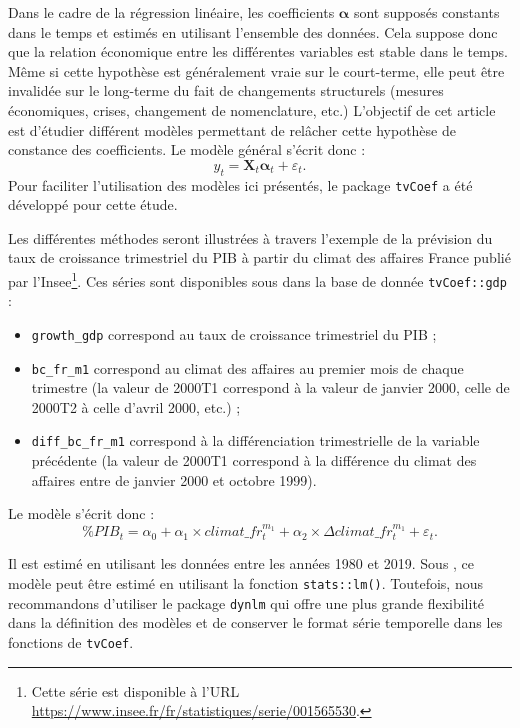 \documentclass[
  a4paper,
  DIV=11,
  numbers=noendperiod,
  french]{scrartcl}
\newcommand\1{{\mathds 1}}
\newcommand{\bf}[1]{{\boldsymbol #1}}
\theoremstyle{remark}
\begin{document}
Dans le cadre de la régression linéaire, les coefficients \(\bf\alpha\)
sont supposés constants dans le temps et estimés en utilisant l'ensemble
des données. Cela suppose donc que la relation économique entre les
différentes variables est stable dans le temps. Même si cette hypothèse
est généralement vraie sur le court-terme, elle peut être invalidée sur
le long-terme du fait de changements structurels (mesures économiques,
crises, changement de nomenclature, etc.) L'objectif de cet article est
d'étudier différent modèles permettant de relâcher cette hypothèse de
constance des coefficients. Le modèle général s'écrit donc : \[
y_t={\bf X_t} \bf\alpha_t  +\varepsilon_t.
\] Pour faciliter l'utilisation des modèles ici présentés, le package
 \texttt{tvCoef} \autocite{tvcoef} a été développé
pour cette étude.

Les différentes méthodes seront illustrées à travers l'exemple de la
prévision du taux de croissance trimestriel du PIB à partir du climat
des affaires France publié par l'Insee\footnote{ Cette série est
  disponible à l'URL
  \url{https://www.insee.fr/fr/statistiques/serie/001565530}.}. Ces
séries sont disponibles sous  dans la base de donnée
\texttt{tvCoef::gdp} :

\begin{itemize}
\item
  \texttt{growth\_gdp} correspond au taux de croissance trimestriel du
  PIB ;
\item
  \texttt{bc\_fr\_m1} correspond au climat des affaires au premier mois
  de chaque trimestre (la valeur de 2000T1 correspond à la valeur de
  janvier 2000, celle de 2000T2 à celle d'avril 2000, etc.) ;
\item
  \texttt{diff\_bc\_fr\_m1} correspond à la différenciation
  trimestrielle de la variable précédente (la valeur de 2000T1
  correspond à la différence du climat des affaires entre de janvier
  2000 et octobre 1999).
\end{itemize}

Le modèle s'écrit donc : \[
\% PIB_t=\alpha_0 + \alpha_1\times climat\_fr_t^{m_1} + \alpha_2\times \Delta climat\_fr_t^{m_1}+\varepsilon_t.
\]

Il est estimé en utilisant les données entre les années 1980 et 2019.
Sous , ce modèle peut être estimé en utilisant la
fonction \texttt{stats::lm()}. Toutefois, nous recommandons d'utiliser
le package \texttt{dynlm} \autocite{dynlm} qui offre une plus grande
flexibilité dans la définition des modèles et de conserver le format
série temporelle dans les fonctions de \texttt{tvCoef}.
\end{document}
